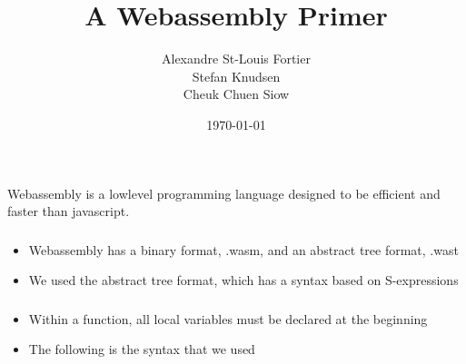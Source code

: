 \documentclass{beamer}
\title[A Webassembly Primer]{A Webassembly Primer}
\author{
Alexandre St-Louis Fortier \\
Stefan Knudsen \\
Cheuk Chuen Siow }
\institute[McGill] {COMP 527 - Group 14}
\date{\today}
\begin{document}
\lstset{language=ML}

\begin{frame}
\titlepage %
\end{frame}



\begin{frame}
\frametitle{}
\begin{block}{}
  Webassembly is a lowlevel programming language designed to be efficient and faster than javascript.
\end{block}

\end{frame}


\begin{frame}
\frametitle{}
\begin{itemize}
\item Webassembly has a binary format, .wasm, and an abstract tree format, .wast
\item We used the abstract tree format, which has a syntax based on S-expressions
\end{itemize}
\end{frame}


\begin{frame}
\frametitle{}

\begin{itemize}
  \item Within a function, all local variables must be declared at the beginning
  \item The following is the syntax that we used
\end{itemize}
\end{frame}
\end{document}
